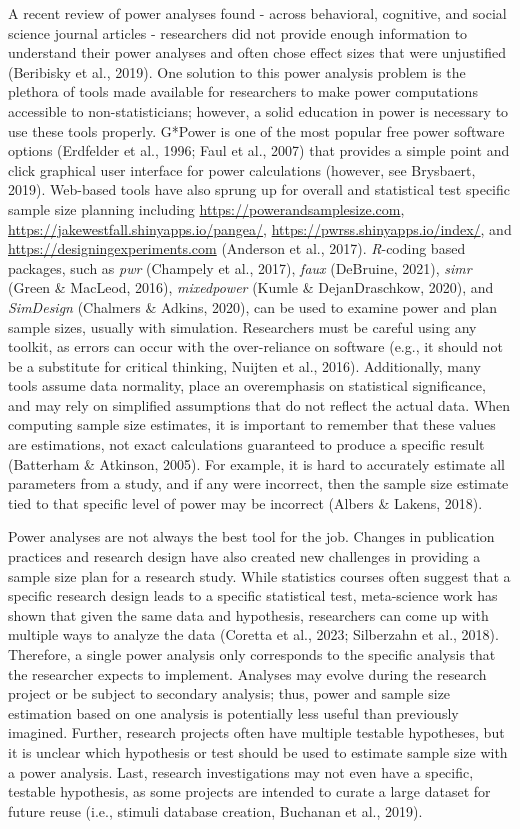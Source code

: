 \documentclass[
  man]{apa7}
\begin{document}
A recent review of power analyses found - across behavioral, cognitive, and social science journal articles - researchers did not provide enough information to understand their power analyses and often chose effect sizes that were unjustified (Beribisky et al., 2019). One solution to this power analysis problem is the plethora of tools made available for researchers to make power computations accessible to non-statisticians; however, a solid education in power is necessary to use these tools properly. G*Power is one of the most popular free power software options (Erdfelder et al., 1996; Faul et al., 2007) that provides a simple point and click graphical user interface for power calculations (however, see Brysbaert, 2019). Web-based tools have also sprung up for overall and statistical test specific sample size planning including \url{https://powerandsamplesize.com}, \url{https://jakewestfall.shinyapps.io/pangea/}, \url{https://pwrss.shinyapps.io/index/}, and \url{https://designingexperiments.com} (Anderson et al., 2017). \emph{R}-coding based packages, such as \emph{pwr} (Champely et al., 2017), \emph{faux} (DeBruine, 2021), \emph{simr} (Green \& MacLeod, 2016), \emph{mixedpower} (Kumle \& DejanDraschkow, 2020), and \emph{SimDesign} (Chalmers \& Adkins, 2020), can be used to examine power and plan sample sizes, usually with simulation. Researchers must be careful using any toolkit, as errors can occur with the over-reliance on software (e.g., it should not be a substitute for critical thinking, Nuijten et al., 2016). Additionally, many tools assume data normality, place an overemphasis on statistical significance, and may rely on simplified assumptions that do not reflect the actual data. When computing sample size estimates, it is important to remember that these values are estimations, not exact calculations guaranteed to produce a specific result (Batterham \& Atkinson, 2005). For example, it is hard to accurately estimate all parameters from a study, and if any were incorrect, then the sample size estimate tied to that specific level of power may be incorrect (Albers \& Lakens, 2018).

Power analyses are not always the best tool for the job. Changes in publication practices and research design have also created new challenges in providing a sample size plan for a research study. While statistics courses often suggest that a specific research design leads to a specific statistical test, meta-science work has shown that given the same data and hypothesis, researchers can come up with multiple ways to analyze the data (Coretta et al., 2023; Silberzahn et al., 2018). Therefore, a single power analysis only corresponds to the specific analysis that the researcher expects to implement. Analyses may evolve during the research project or be subject to secondary analysis; thus, power and sample size estimation based on one analysis is potentially less useful than previously imagined. Further, research projects often have multiple testable hypotheses, but it is unclear which hypothesis or test should be used to estimate sample size with a power analysis. Last, research investigations may not even have a specific, testable hypothesis, as some projects are intended to curate a large dataset for future reuse (i.e., stimuli database creation, Buchanan et al., 2019).
\end{document}
